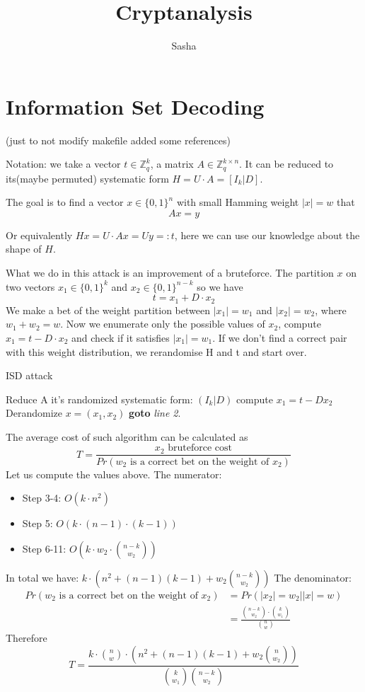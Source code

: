 \documentclass[12pt]{article}
\title{Cryptanalysis}
\author{ Sasha }
\newcommand{\ZZ}{\mathbb{Z}}
\begin{document}
\maketitle

\section{Information Set Decoding}

\cite{[DP19]}(just to not modify makefile added some references)

Notation: we take a vector $t \in \ZZ_q^{k}$, a matrix $A \in \ZZ_q^{k \times n}$. It can be reduced to its(maybe permuted) systematic form $H  = U \cdot A = [I_{k}|D]$.


The goal is to find a vector $x \in \{0,1\}^{n}$ with small Hamming weight $|x| = w$ that
\[
Ax = y
\]

Or equivalently $Hx = U\cdot Ax = Uy =: t$, here we can use our knowledge about the shape of $H$.

What we do in this attack is an improvement of a bruteforce. The partition $x$ on two vectors $x_1 \in \{0,1\}^{k}$ and  $x_2  \in \{0,1\}^{n-k}$ so we have
\[
t = x_1 + D \cdot x_2
\]
We make a bet of the weight partition between $|x_1| = w_1$ and $|x_2| = w_2$, where $w_1 + w_2 = w$. Now we enumerate only the possible values of $x_2$, compute $x_1 = t - D \cdot x_2$ and check if it satisfies $|x_1| = w_1$. If we don't find a correct pair with this weight distribution, we rerandomise H and t and start over.
\begin{algorithm}
\caption{ISD attack}\label{ISD}
\begin{algorithmic}[1]
    \State Reduce A it's randomized systematic form: $(I_k |D)$
        \State compute $x_1 = t - Dx_2$
        \State \Return Derandomize $x = (x_1, x_2)$
        \EndIf
    \EndFor
\State \textbf{goto} \emph{line 2}.
\EndProcedure
\end{algorithmic}
\end{algorithm}
The average cost of such algorithm can be calculated as
\[
T = \frac{x_2\text{ bruteforce cost}}{Pr(w_2\text{ is a correct bet on the weight of }x_2)}
\]
Let us compute the values above.
The numerator:
\begin{itemize}
    \item Step 3-4: $O(k\cdot n^2)$
    \item Step 5: $O(k \cdot (n-1) \cdot (k-1))$
    \item Step 6-11: $O(k \cdot w_2 \cdot \binom{n-k}{w_2})$
\end{itemize}
In total we have: $k \cdot (n^2 + (n-1)(k-1) + w_2\binom{n-k}{w_2})$
The denominator:
\[
\begin{split}
    Pr(w_2\text{ is a correct bet on the weight of }x_2) & = Pr(|x_2| = w_2||x| = w) \\
    & = \frac{\binom{n-k}{w_2} \cdot \binom{k}{w_1}}{\binom{n}{w}}
\end{split}
\]
Therefore
\[
T = \frac{k\cdot\binom{n}{w}\cdot(n^2 + (n-1)(k-1) + w_2\binom{n}{w_2})}{\binom{k}{w_1}\binom{n-k}{w_2}}
\]
\end{document}
